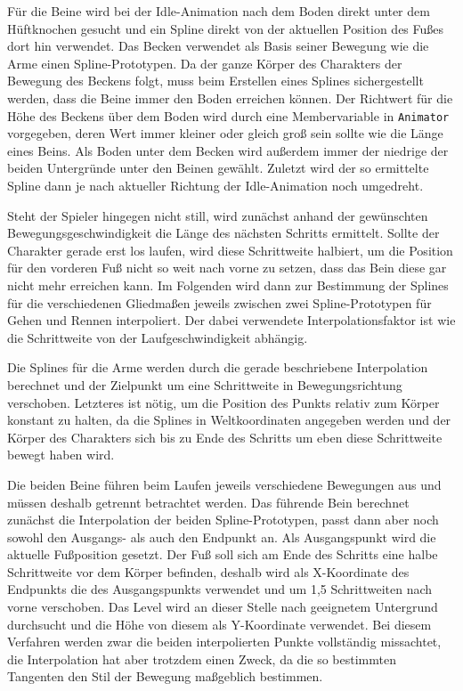 Für die Beine wird bei der Idle-Animation nach dem Boden direkt unter dem Hüftknochen gesucht und ein Spline direkt von der aktuellen Position des Fußes dort hin verwendet. Das Becken verwendet als Basis seiner Bewegung wie die Arme einen Spline-Prototypen. Da der ganze Körper des Charakters der Bewegung des Beckens folgt, muss beim Erstellen eines Splines sichergestellt werden, dass die Beine immer den Boden erreichen können. Der Richtwert für die Höhe des Beckens über dem Boden wird durch eine Membervariable in \lstinline{Animator} vorgegeben, deren Wert immer kleiner oder gleich groß sein sollte wie die Länge eines Beins. Als Boden unter dem Becken wird außerdem immer der niedrige der beiden Untergründe unter den Beinen gewählt. Zuletzt wird der so ermittelte Spline dann je nach aktueller Richtung der Idle-Animation noch umgedreht.

Steht der Spieler hingegen nicht still, wird zunächst anhand der gewünschten Bewegungsgeschwindigkeit die Länge des nächsten Schritts ermittelt. Sollte der Charakter gerade erst los laufen, wird diese Schrittweite halbiert, um die Position für den vorderen Fuß nicht so weit nach vorne zu setzen, dass das Bein diese gar nicht mehr erreichen kann. Im Folgenden wird dann zur Bestimmung der Splines für die verschiedenen Gliedmaßen jeweils zwischen zwei Spline-Prototypen für Gehen und Rennen interpoliert. Der dabei verwendete Interpolationsfaktor ist wie die Schrittweite von der Laufgeschwindigkeit abhängig.

Die Splines für die Arme werden durch die gerade beschriebene Interpolation berechnet und der Zielpunkt um eine Schrittweite in Bewegungsrichtung verschoben. Letzteres ist nötig, um die Position des Punkts relativ zum Körper konstant zu halten, da die Splines in Weltkoordinaten angegeben werden und der Körper des Charakters sich bis zu Ende des Schritts um eben diese Schrittweite bewegt haben wird.

Die beiden Beine führen beim Laufen jeweils verschiedene Bewegungen aus und müssen deshalb getrennt betrachtet werden. Das führende Bein berechnet zunächst die Interpolation der beiden Spline-Prototypen, passt dann aber noch sowohl den Ausgangs- als auch den Endpunkt an. Als Ausgangspunkt wird die aktuelle Fußposition gesetzt. Der Fuß soll sich am Ende des Schritts eine halbe Schrittweite vor dem Körper befinden, deshalb wird als X-Koordinate des Endpunkts die des Ausgangspunkts verwendet und um 1,5 Schrittweiten nach vorne verschoben. Das Level wird an dieser Stelle nach geeignetem Untergrund durchsucht und die Höhe von diesem als Y-Koordinate verwendet. Bei diesem Verfahren werden zwar die beiden interpolierten Punkte vollständig missachtet, die Interpolation hat aber trotzdem einen Zweck, da die so bestimmten Tangenten den Stil der Bewegung maßgeblich bestimmen.

